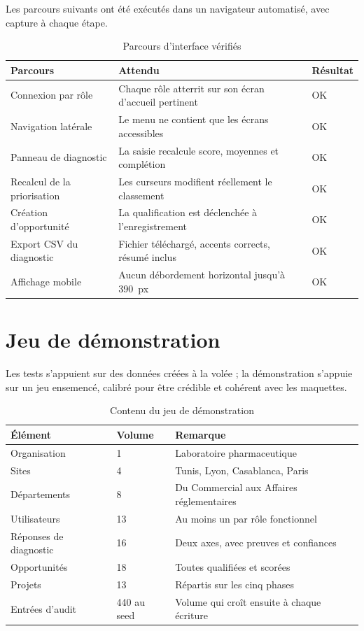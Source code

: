 Les parcours suivants ont été exécutés dans un navigateur automatisé, avec capture à
chaque étape.

\begin{table}[H]
\centering
\caption{Parcours d'interface vérifiés}
\label{tab:tests-ui}
\small
\begin{tabular}{@{}L{5.6cm} L{6.4cm} C{1.8cm}@{}}
\toprule
\textbf{Parcours} & \textbf{Attendu} & \textbf{Résultat} \\
\midrule
Connexion par rôle
& Chaque rôle atterrit sur son écran d'accueil pertinent & OK \\
Navigation latérale
& Le menu ne contient que les écrans accessibles & OK \\
Panneau de diagnostic
& La saisie recalcule score, moyennes et complétion & OK \\
Recalcul de la priorisation
& Les curseurs modifient réellement le classement & OK \\
Création d'opportunité
& La qualification est déclenchée à l'enregistrement & OK \\
Export CSV du diagnostic
& Fichier téléchargé, accents corrects, résumé inclus & OK \\
Affichage mobile
& Aucun débordement horizontal jusqu'à 390~px & OK \\
\bottomrule
\end{tabular}
\end{table}

\section{Jeu de démonstration}

Les tests s'appuient sur des données créées à la volée ; la démonstration s'appuie sur
un jeu ensemencé, calibré pour être crédible et cohérent avec les maquettes.

\begin{table}[H]
\centering
\caption{Contenu du jeu de démonstration}
\label{tab:seed}
\small
\begin{tabular}{@{}L{6cm} C{2.4cm} L{5.4cm}@{}}
\toprule
\textbf{Élément} & \textbf{Volume} & \textbf{Remarque} \\
\midrule
Organisation & 1 & Laboratoire pharmaceutique \\
Sites & 4 & Tunis, Lyon, Casablanca, Paris \\
Départements & 8 & Du Commercial aux Affaires réglementaires \\
Utilisateurs & 13 & Au moins un par rôle fonctionnel \\
Réponses de diagnostic & 16 & Deux axes, avec preuves et confiances \\
Opportunités & 18 & Toutes qualifiées et scorées \\
Projets & 13 & Répartis sur les cinq phases \\
Entrées d'audit & 440 au seed & Volume qui croît ensuite à chaque écriture \\
\bottomrule
\end{tabular}
\end{table}

